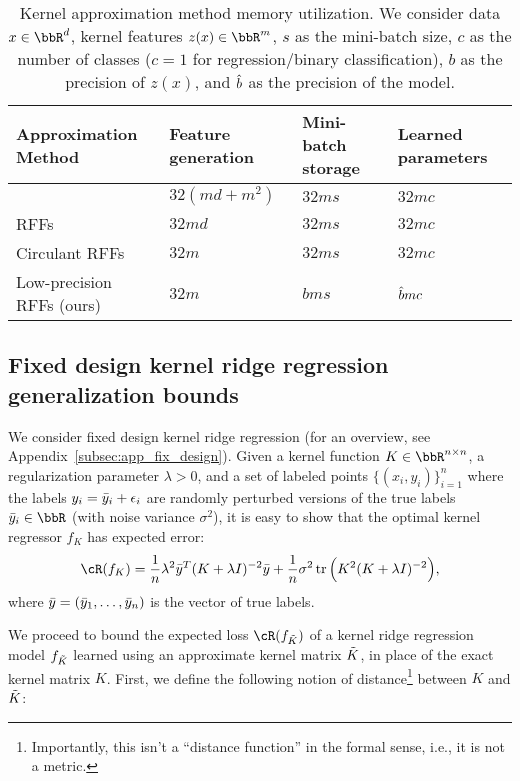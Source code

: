 \begin{table}[h]
	\caption{Kernel approximation method memory utilization. We consider data $x\in\RR^d$, kernel features $z(x)\in\RR^m$, $s$ as the mini-batch size, $c$ as the number of classes ($c=1$ for regression/binary classification), $b$ as the precision of $z(x)$, and $\hat{b}$ as the precision of the model.}
	\label{table:mem-usage}
	\centering
	\begin{tabular}{llll}
		\toprule
		Approximation Method        & Feature generation & Mini-batch storage & Learned parameters \\
		\midrule
		\Nystrom \citep{nystrom}    & $32(md + m^2)$     & $32ms$             & $32mc$ \\
		RFFs \citep{rahimi07random} & $32md$             & $32ms$             & $32mc$ \\
		Circulant RFFs \citep{yu15} & $32m$              & $32ms$             & $32mc$ \\
		Low-precision RFFs (ours)   & $32m$              & $bms$              & $\hat{b} mc$ \\
		\bottomrule
	\end{tabular}
\end{table}

\subsection{Fixed design kernel ridge regression generalization bounds}
\label{sec:genbound}
We consider fixed design kernel ridge regression (for an overview, see Appendix~\ref{subsec:app_fix_design}). Given a kernel function $K\in\RR^{n\times n}$, a regularization parameter $\lambda > 0$, and a set of labeled points $\{(x_i,y_i)\}_{i=1}^n$ where the labels $y_i=\bar{y}_i + \epsilon_i$ are randomly perturbed versions of the true labels $\by_i \in \RR$ (with noise variance $\sigma^2$), it is easy to show \citep{alaoui15} that the optimal kernel regressor $f_K$ has expected error:
\begin{eqnarray}
\cR(f_K) = \frac{1}{n}\lambda^2 \by^T(K+\lambda I)^{-2}\by + \frac{1}{n}\sigma^2 \tr\Big(K^2(K+\lambda \id)^{-2}\Big),
\end{eqnarray}
where $\bar{y} = (\bar{y}_1,\ldots,\bar{y}_n)$ is the vector of true labels.

We proceed to bound the expected loss $\cR(f_{\tK})$ of a kernel ridge regression model $f_{\tilde{K}}$ learned using an approximate kernel matrix $\tilde{K}$, in place of the exact kernel matrix $K$. First, we define the following notion of distance\footnote{Importantly, this isn't a ``distance function'' in the formal sense, i.e., it is not a metric.} between $K$ and $\tilde{K}$:

